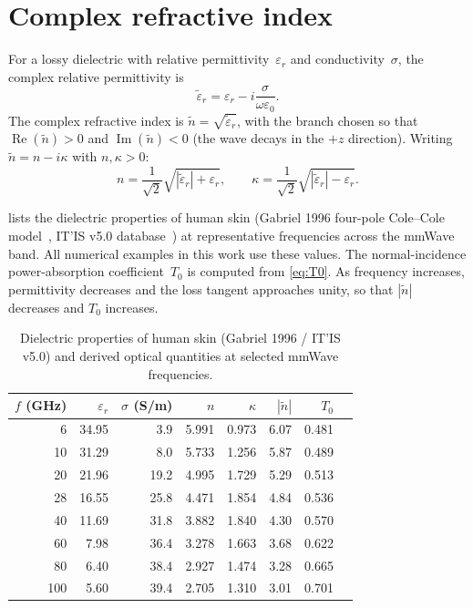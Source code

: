 \documentclass[11pt,a4paper]{article}
\theoremstyle{definition}      %
\newcommand{\ntilde}{\tilde{n}}
\newcommand{\epstilde}{\tilde{\varepsilon}_r}
\DeclareMathOperator{\RE}{Re}
\DeclareMathOperator{\IM}{Im}
\begin{document}
\appendix
{}

\section{Complex refractive index}\label{app:refractive-index}

For a lossy dielectric with relative permittivity~$\varepsilon_r$ and
conductivity~$\sigma$, the complex relative permittivity is
\begin{equation}
  \epstilde = \varepsilon_r - i\frac{\sigma}{\omega\varepsilon_0}.
\end{equation}
The complex refractive index is $\ntilde=\sqrt{\epstilde}$, with the
branch chosen so that $\RE(\ntilde)>0$ and $\IM(\ntilde)<0$ (the wave
decays in the $+z$ direction).  Writing $\ntilde=n-i\kappa$ with
$n,\kappa>0$:
\begin{equation}
  n = \frac{1}{\sqrt{2}}\sqrt{|\epstilde|+\varepsilon_r}, \qquad
  \kappa = \frac{1}{\sqrt{2}}\sqrt{|\epstilde|-\varepsilon_r}.
\end{equation}

 lists the dielectric properties of human skin
(Gabriel 1996 four-pole Cole--Cole model~\cite{Gabriel1996}, IT'IS
v5.0 database~\cite{ITISv5}) at representative frequencies across the
mmWave band.  All numerical examples in this work use these
values.  The normal-incidence
power-absorption coefficient~$T_0$ is computed from
\cref{eq:T0}.  As frequency increases, permittivity decreases
and the loss tangent approaches unity, so that
$|\ntilde|$ decreases and $T_0$ increases.

\begin{table}[!htbp]
\centering
\caption{Dielectric properties of human skin (Gabriel 1996 /
  IT'IS v5.0) and derived optical quantities at selected mmWave
  frequencies.}\label{tab:skin-data}
\begin{tabular}{rrrrrrrr}
\toprule
$f$ (GHz) & $\varepsilon_r$ & $\sigma$ (S/m) &
  $n$ & $\kappa$ & $|\ntilde|$ & $T_0$ \\
\midrule
6   & 34.95 & \phantom{0}3.9 & 5.991 & 0.973 & 6.07 & 0.481 \\
10  & 31.29 & \phantom{0}8.0 & 5.733 & 1.256 & 5.87 & 0.489 \\
20  & 21.96 &           19.2 & 4.995 & 1.729 & 5.29 & 0.513 \\
28  & 16.55 &           25.8 & 4.471 & 1.854 & 4.84 & 0.536 \\
40  & 11.69 &           31.8 & 3.882 & 1.840 & 4.30 & 0.570 \\
60  & \phantom{0}7.98 & 36.4 & 3.278 & 1.663 & 3.68 & 0.622 \\
80  & \phantom{0}6.40 & 38.4 & 2.927 & 1.474 & 3.28 & 0.665 \\
100 & \phantom{0}5.60 & 39.4 & 2.705 & 1.310 & 3.01 & 0.701 \\
\bottomrule
\end{tabular}
\end{table}
\end{document}
